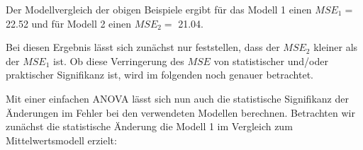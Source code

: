 \documentclass[]{article}
\newenvironment{Shaded}{\begin{snugshade}}{\end{snugshade}}
\newcommand{\CommentTok}[1]{\textcolor[rgb]{0.56,0.35,0.01}{\textit{#1}}}
\newcommand{\DataTypeTok}[1]{\textcolor[rgb]{0.13,0.29,0.53}{#1}}
\newcommand{\DecValTok}[1]{\textcolor[rgb]{0.00,0.00,0.81}{#1}}
\newcommand{\KeywordTok}[1]{\textcolor[rgb]{0.13,0.29,0.53}{\textbf{#1}}}
\newcommand{\NormalTok}[1]{#1}
\newcommand{\OperatorTok}[1]{\textcolor[rgb]{0.81,0.36,0.00}{\textbf{#1}}}
\newcommand{\StringTok}[1]{\textcolor[rgb]{0.31,0.60,0.02}{#1}}
\begin{document}
Der Modellvergleich der obigen Beispiele ergibt für das Modell 1 einen \(MSE_1 =\) 22.52 und für Modell 2 einen \(MSE_2 =\) 21.04.

Bei diesen Ergebnis lässt sich zunächst nur feststellen, dass der \(MSE_2\) kleiner als der \(MSE_1\) ist. Ob diese Verringerung des \(MSE\) von statistischer und/oder praktischer Signifikanz ist, wird im folgenden noch genauer betrachtet.

Mit einer einfachen ANOVA lässt sich nun auch die statistische Signifikanz der Änderungen im Fehler bei den verwendeten Modellen berechnen. Betrachten wir zunächst die statistische Änderung die Modell 1 im Vergleich zum Mittelwertsmodell erzielt:

\begin{Shaded}
\end{Shaded}
\end{document}
